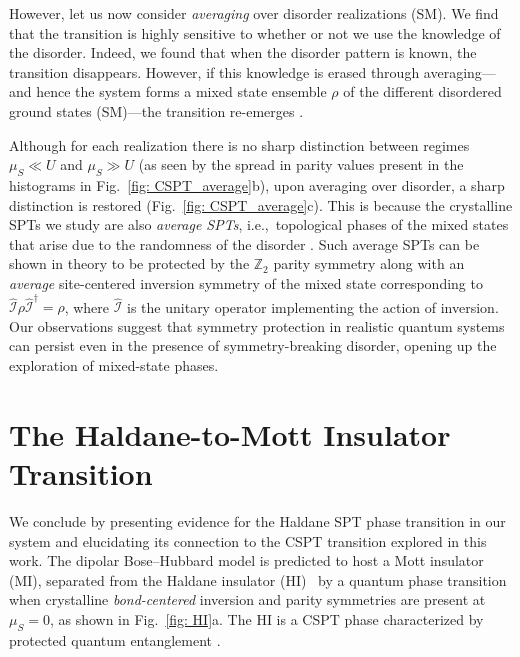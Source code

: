 \documentclass[preprint,superscriptaddress,floatfix, nofootinbib]{revtex4-2}
\begin{document}
However, let us now consider \textit{averaging} over disorder realizations (SM). 
%
We find that the transition is highly sensitive to whether or not we use the knowledge of the disorder.
%
Indeed, we found that when the disorder pattern is known, the transition disappears.
%
However, if this knowledge is erased through averaging---and hence the system forms a mixed state ensemble $\rho$ of the different disordered ground states (SM)---the transition re-emerges \cite{Ma2023}.

%
Although for each realization there is no sharp distinction between regimes $\mu_S \ll U$ and $\mu_S \gg U$ (as seen by the spread in parity values present in the histograms in Fig.~\ref{fig: CSPT_average}b), upon averaging over disorder, a sharp distinction is restored (Fig.~\ref{fig: CSPT_average}c). 
%
This is because the crystalline SPTs we study are also  \textit{average SPTs}, i.e.,~topological phases of the mixed states that arise due to the randomness of the disorder \cite{Fu2012, Ringel12, Mong12, Fulga14, Ma2023, Ma23_b, De2022, Coser2019, Fan2024, Bao2023, Verstraete2009, Diehl2008, Sang2024, Sang2025}.
%
Such average SPTs can be shown in theory to be protected by the $\mathbb{Z}_2$ parity symmetry along with an \textit{average} site-centered inversion symmetry of the mixed state corresponding to $\hat{\mathcal{I}} \rho \hat{\mathcal{I}}^{\dagger} = \rho$, where $\hat{\mathcal{I}}$ is the unitary operator implementing the action of inversion.
%
Our observations suggest that symmetry protection in realistic quantum systems can persist even in the presence of symmetry-breaking disorder, opening up the exploration of mixed-state phases.

\section{The Haldane-to-Mott Insulator Transition \label{sec:HI}}

We conclude by presenting evidence for the Haldane SPT phase transition in our system and elucidating its connection to the CSPT transition explored in this work.
%
The dipolar Bose–Hubbard model is predicted to host a Mott insulator (MI), separated from the Haldane insulator (HI)~\cite{Haldane1983, Buyers1986, Xu1996, Torre2006} by a quantum phase transition when crystalline \textit{bond-centered} inversion and parity symmetries are present at $\mu_S = 0$, as shown in Fig.~\ref{fig: HI}a. The HI is a CSPT phase characterized by protected quantum entanglement \cite{Pollmann2012}.
\end{document}

